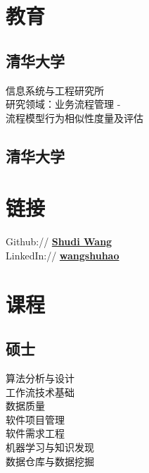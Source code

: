 \documentclass[]{resume_zh}
\begin{document}
\begin{minipage}[t]{0.3\textwidth} 


\section{教育} 

\subsection{清华大学}
信息系统与工程研究所\\
研究领域：业务流程管理 - \\
流程模型行为相似性度量及评估
\sectionsep

\subsection{清华大学}
\sectionsep


\section{链接} 
Github:// \href{https://github.com/shudiwsh2009}{\bf Shudi Wang} \\
LinkedIn://  \href{https://cn.linkedin.com/in/wangshuhao}{\bf wangshuhao} \\
\sectionsep


\section{课程}
\subsection{硕士}
算法分析与设计\\
工作流技术基础\\
数据质量\\
软件项目管理\\
软件需求工程\\
机器学习与知识发现\\
数据仓库与数据挖掘\\
\sectionsep


\end{minipage}
\end{document}
